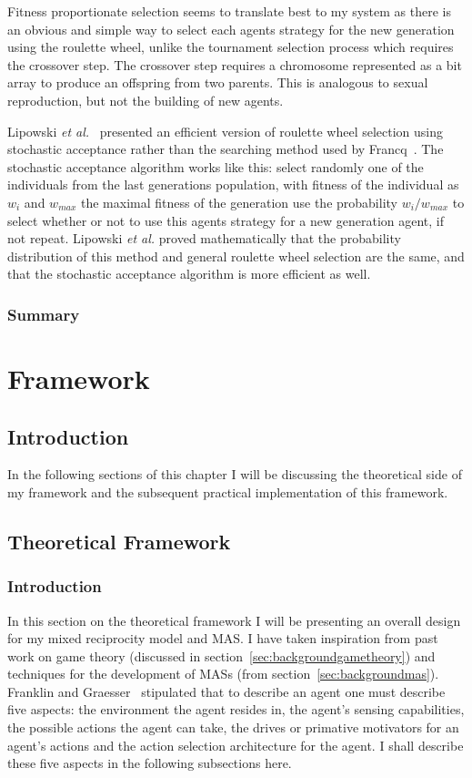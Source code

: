 \documentclass[]{final_report}
\begin{document}
Fitness proportionate selection seems to translate best to my system as there is an obvious and simple way to select each agents strategy for the new generation using the roulette wheel, unlike the tournament selection process which requires the crossover step. The crossover step requires a chromosome represented as a bit array to produce an offspring from two parents. This is analogous to sexual reproduction, but not the building of new agents.\par
Lipowski \textit{et al.}~\cite{lipowski2012roulette} presented an efficient version of roulette wheel selection using stochastic acceptance rather than the searching method used by Francq~\cite{genetic_algorithms}. The stochastic acceptance algorithm works like this: select randomly one of the individuals from the last generations population, with fitness of the individual as $w_i$ and $w_{max}$ the maximal fitness of the generation use the probability $w_i / w_{max}$ to select whether or not to use this agents strategy for a new generation agent, if not repeat. Lipowski \textit{et al.} proved mathematically that the probability distribution of this method and general roulette wheel selection are the same, and that the stochastic acceptance algorithm is more efficient as well.

\subsection{Summary}

\chapter{Framework}

\section{Introduction}
In the following sections of this chapter I will be discussing the theoretical side of my framework and the subsequent practical implementation of this framework.

\section{Theoretical Framework}
\label{sec:theo}

\subsection{Introduction}
In this section on the theoretical framework I will be presenting an overall design for my mixed reciprocity model and MAS. I have taken inspiration from past work on game theory (discussed in section~\ref{sec:backgroundgametheory}) and techniques for the development of MASs (from section~\ref{sec:backgroundmas}). Franklin and Graesser~\cite{franklin1996agent} stipulated that to describe an agent one must describe five aspects: the environment the agent resides in, the agent's sensing capabilities, the possible actions the agent can take, the drives or primative motivators for an agent's actions and the action selection architecture for the agent. I shall describe these five aspects in the following subsections here.
\end{document}
